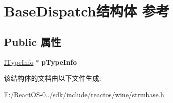 \hypertarget{struct_base_dispatch}{}\section{Base\+Dispatch结构体 参考}
\label{struct_base_dispatch}
\subsection*{Public 属性}
\begin{DoxyCompactItemize}
\item 
\mbox{\label{struct_base_dispatch_a9f27c48362642551f6759a533825cf53}} 
\hyperlink{interface_i_type_info}{I\+Type\+Info} $\ast$ {\bfseries p\+Type\+Info}
\end{DoxyCompactItemize}


该结构体的文档由以下文件生成\+:\begin{DoxyCompactItemize}
\item 
E\+:/\+React\+O\+S-\/0../sdk/include/reactos/wine/strmbase.\+h\end{DoxyCompactItemize}
